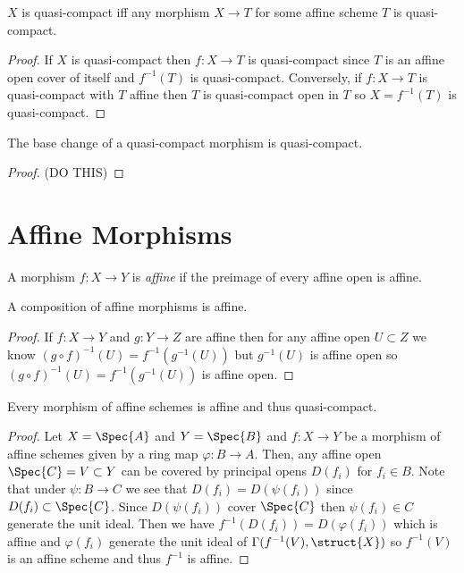 \documentclass[12pt]{article}
\begin{document}
\begin{proposition}
$X$ is quasi-compact iff any morphism $X \to T$ for some affine scheme $T$ is quasi-compact.
\end{proposition}

\begin{proof}
If $X$ is quasi-compact then $f : X \to T$ is quasi-compact since $T$ is an affine open cover of itself and $f^{-1}(T)$ is quasi-compact. Conversely, if $f : X \to T$ is quasi-compact with $T$ affine then $T$ is quasi-compact open in $T$ so $X = f^{-1}(T)$ is quasi-compact.
\end{proof}

\begin{lemma}
The base change of a quasi-compact morphism is quasi-compact.
\end{lemma}

\begin{proof}
(DO THIS)
\end{proof}

\section{Affine Morphisms}

\begin{defn}
A morphism $f : X \to Y$ is \textit{affine} if the preimage of every affine open is affine.
\end{defn}

\begin{lemma}
A composition of affine morphisms is affine.
\end{lemma}

\begin{proof}
If $f : X \to Y$ and $g : Y \to Z$ are affine then for any affine open $U \subset Z$ we know $(g \circ f)^{-1}(U) = f^{-1}(g^{-1}(U))$ but $g^{-1}(U)$ is affine open so $(g \circ f)^{-1}(U) = f^{-1}(g^{-1}(U))$ is affine open.
\end{proof}

\begin{lemma}
Every morphism of affine schemes is affine and thus quasi-compact.
\end{lemma}

\begin{proof}
Let $X = \Spec{A}$ and $Y = \Spec{B}$ and $f : X \to Y$ be a morphism of affine schemes given by a ring map $\varphi : B \to A$. Then, any affine open $\Spec{C} = V \subset Y$ can be covered by principal opens $D(f_i)$ for $f_i \in B$. Note that under $\psi : B \to C$ we see that $D(f_i) = D(\psi(f_i))$ since $D(f_i) \subset \Spec{C}$. Since $D(\psi(f_i))$ cover $\Spec{C}$ then $\psi(f_i) \in C$ generate the unit ideal. Then we have $f^{-1}(D(f_i)) = D(\varphi(f_i))$ which is affine and $\varphi(f_i)$ generate the unit ideal of $\Gamma(f^{-1}(V), \struct{X})$ so $f^{-1}(V)$ is an affine scheme and thus $f^{-1}$ is affine.
\end{proof}
\end{document}
